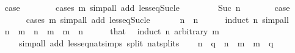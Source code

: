 \begin{isabellebody}
\ \isamarkupfalse%
\ {\isacharquery}{\kern0pt}case\isanewline
\ \ \ \ \ \ \isamarkupfalse%
\ {\isacharparenleft}{\kern0pt}cases\ m{\isacharparenright}{\kern0pt}\ {\isacharparenleft}{\kern0pt}simp{\isacharunderscore}{\kern0pt}all\ add{\isacharcolon}{\kern0pt}\ less{\isacharunderscore}{\kern0pt}eq{\isacharunderscore}{\kern0pt}Suc{\isacharunderscore}{\kern0pt}le{\isacharparenright}{\kern0pt}\isanewline
\ \ \isamarkupfalse%
\isanewline
\ \ \ \ \isamarkupfalse%
\ {\isacharparenleft}{\kern0pt}Suc\ n{\isacharparenright}{\kern0pt}\isanewline
\ \ \ \ \isamarkupfalse%
\ \isamarkupfalse%
\ {\isacharquery}{\kern0pt}case\isanewline
\ \ \ \ \ \ \isamarkupfalse%
\ {\isacharparenleft}{\kern0pt}cases\ m{\isacharparenright}{\kern0pt}\ {\isacharparenleft}{\kern0pt}simp{\isacharunderscore}{\kern0pt}all\ add{\isacharcolon}{\kern0pt}\ less{\isacharunderscore}{\kern0pt}eq{\isacharunderscore}{\kern0pt}Suc{\isacharunderscore}{\kern0pt}le{\isacharparenright}{\kern0pt}\isanewline
\ \ \isamarkupfalse%
\isanewline
\ \ \isamarkupfalse%
\ {\isachardoublequoteopen}n\ {\isasymle}\ n{\isachardoublequoteclose}\isanewline
\ \ \ \ \isamarkupfalse%
\ {\isacharparenleft}{\kern0pt}induct\ n{\isacharparenright}{\kern0pt}\ simp{\isacharunderscore}{\kern0pt}all\isanewline
\ \ \isamarkupfalse%
\ \isamarkupfalse%
\ {\isachardoublequoteopen}n\ {\isacharequal}{\kern0pt}\ m{\isachardoublequoteclose}\ \ {\isachardoublequoteopen}n\ {\isasymle}\ m{\isachardoublequoteclose}\ \ {\isachardoublequoteopen}m\ {\isasymle}\ n{\isachardoublequoteclose}\isanewline
\ \ \ \ \isamarkupfalse%
\ that\ \isamarkupfalse%
\ {\isacharparenleft}{\kern0pt}induct\ n\ arbitrary{\isacharcolon}{\kern0pt}\ m{\isacharparenright}{\kern0pt}\isanewline
\ \ \ \ \ \ {\isacharparenleft}{\kern0pt}simp{\isacharunderscore}{\kern0pt}all\ add{\isacharcolon}{\kern0pt}\ less{\isacharunderscore}{\kern0pt}eq{\isacharunderscore}{\kern0pt}nat{\isachardot}{\kern0pt}simps{\isacharparenleft}{\kern0pt}{}{\isacharparenright}{\kern0pt}\ split{\isacharcolon}{\kern0pt}\ nat{\isachardot}{\kern0pt}splits{\isacharparenright}{\kern0pt}\isanewline
\ \ \isamarkupfalse%
\ {\isachardoublequoteopen}n\ {\isasymle}\ q{\isachardoublequoteclose}\ \ {\isachardoublequoteopen}n\ {\isasymle}\ m{\isachardoublequoteclose}\ \ {\isachardoublequoteopen}m\ {\isasymle}\ q{\isachardoublequoteclose}\isanewline

\end{isabellebody}
